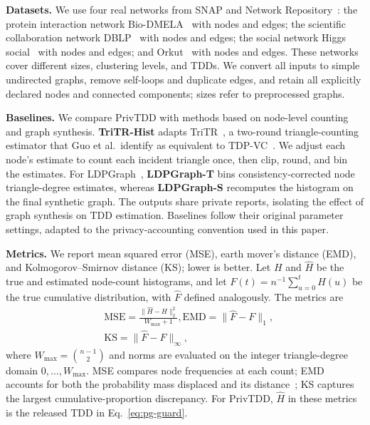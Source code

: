 \noindent\textbf{Datasets.}
We use four real networks from SNAP and Network Repository~\cite{snapnets,rossi2015networkrepository}: the protein interaction network Bio-DMELA~\cite{singh2008alignment} with  nodes and  edges; 
the scientific collaboration network DBLP~\cite{yang2012communities} with  nodes and  edges; 
the social network Higgs social~\cite{dedomenico2013rumor} with  nodes and  edges; 
and Orkut~\cite{mislove2007measurement} with  nodes and  edges.
These networks cover different sizes, clustering levels, and TDDs.
We convert all inputs to simple undirected graphs, remove self-loops and duplicate edges, and retain all explicitly declared nodes and connected components; sizes refer to preprocessed graphs.

\noindent\textbf{Baselines.}
We compare PrivTDD with methods based on node-level counting and graph synthesis.
\textbf{TriTR-Hist} adapts TriTR~\cite{guo2026tritr}, 
a two-round triangle-counting estimator that Guo et al.\ identify as equivalent to TDP-VC~\cite{he2025robust}.
We adjust each node's estimate to count each incident triangle once, then clip, round, and bin the estimates.
For LDPGraph~\cite{dong2026ldpgraph}, \textbf{LDPGraph-T} bins consistency-corrected node triangle-degree estimates, whereas \textbf{LDPGraph-S} recomputes the histogram on the final synthetic graph.
The outputs share private reports, isolating the effect of graph synthesis on TDD estimation.
Baselines follow their original parameter settings, adapted to the privacy-accounting convention used in this paper.



\noindent\textbf{Metrics.}
We report mean squared error (MSE), earth mover's distance (EMD), and Kolmogorov--Smirnov distance (KS); lower is better.
Let $H$ and $\widehat H$ be the true and estimated node-count histograms, and let $F(t)=n^{-1}\sum_{u=0}^{t}H(u)$ be the true cumulative distribution, with $\widehat F$ defined analogously.
The metrics are
\begin{equation}
\begin{aligned}
&\mathrm{MSE}=\frac{\|\widehat H-H\|_2^2}{W_{\max}+1},\mathrm{EMD}=\|\widehat F-F\|_1,\\
&\mathrm{KS}=\|\widehat F-F\|_\infty,
\end{aligned}
\label{eq:gdd:en:metrics}
\end{equation}
where $W_{\max}=\binom{n-1}{2}$ and norms are evaluated on the integer triangle-degree domain $0,\ldots,W_{\max}$.
MSE compares node frequencies at each count; EMD accounts for both the probability mass displaced and its distance~\cite{rubner2000emd}; KS captures the largest cumulative-proportion discrepancy.
For PrivTDD, $\widehat H$ in these metrics is the released TDD in Eq.~\eqref{eq:pg-guard}.

